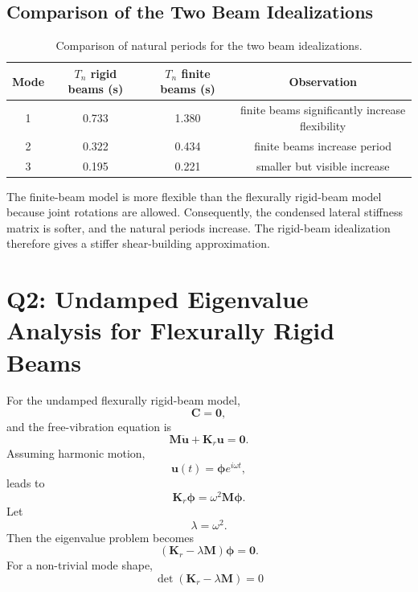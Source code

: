 \documentclass[11pt,a4paper]{article}
\begin{document}
\subsection{Comparison of the Two Beam Idealizations}

\begin{table}[H]
\centering
\caption{Comparison of natural periods for the two beam idealizations.}
\begin{tabular}{cccc}
\toprule
Mode & $T_n$ rigid beams (s) & $T_n$ finite beams (s) & Observation\\
\midrule
1 & 0.733 & 1.380 & finite beams significantly increase flexibility\\
2 & 0.322 & 0.434 & finite beams increase period\\
3 & 0.195 & 0.221 & smaller but visible increase\\
\bottomrule
\end{tabular}
\label{tab:q1_period_comparison}
\end{table}

The finite-beam model is more flexible than the flexurally rigid-beam model because joint rotations are allowed. Consequently, the condensed lateral stiffness matrix is softer, and the natural periods increase. The rigid-beam idealization therefore gives a stiffer shear-building approximation.
\pagebreak
\section{Q2: Undamped Eigenvalue Analysis for Flexurally Rigid Beams}

For the undamped flexurally rigid-beam model,
\begin{equation}
\bm{C}=\bm{0},
\end{equation}
and the free-vibration equation is
\begin{equation}
\bm{M}\ddot{\bm{u}}+\bm{K}_r\bm{u}=\bm{0}.
\end{equation}
Assuming harmonic motion,
\begin{equation}
\bm{u}(t)=\bm{\phi}e^{i\omega t},
\end{equation}
leads to
\begin{equation}
\bm{K}_r\bm{\phi}=\omega^2\bm{M}\bm{\phi}.
\end{equation}
Let
\begin{equation}
\lambda=\omega^2.
\end{equation}
Then the eigenvalue problem becomes
\begin{equation}
(\bm{K}_r-\lambda\bm{M})\bm{\phi}=\bm{0}.
\end{equation}
For a non-trivial mode shape,
\begin{equation}
\boxed{\det(\bm{K}_r-\lambda\bm{M})=0}
\end{equation}
\end{document}
